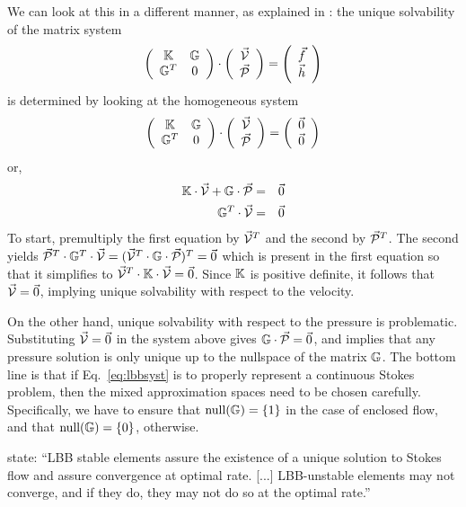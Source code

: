 We can look at this in a different manner, as explained in \textcite{elsw}:
the unique solvability of the matrix system
\begin{equation}
\left(
\begin{array}{cc}
{\mathbb{K}} & {\mathbb{G}} \\
{\mathbb{G}}^T & 0 
\end{array}
\right)
\cdot 
\left(
\begin{array}{c}
\vec{\cal V} \\ \vec{\cal P}
\end{array}
\right)
=
\left(
\begin{array}{c}
\vec{f} \\ \vec{h}
\end{array}
\right)
\label{eq:lbbsyst}
\end{equation}
is determined by looking at the homogeneous system
\begin{equation}
\left(
\begin{array}{cc}
{\mathbb{K}} & {\mathbb{G}} \\
{\mathbb{G}}^T & 0 
\end{array}
\right)
\cdot 
\left(
\begin{array}{c}
\vec{\cal V} \\ \vec{\cal P}
\end{array}
\right)
=
\left(
\begin{array}{c}
\vec{0} \\ \vec{0}
\end{array}
\right)
\end{equation}
or,
\begin{eqnarray}
{\mathbb{K}} \cdot \vec{\cal V} + {\mathbb{G}} \cdot \vec{\cal P} &=& \vec{0} \nonumber\\
{\mathbb{G}}^T \cdot \vec{\cal V} &=& \vec{0}
\end{eqnarray}
To start, premultiply the first equation by $\vec{\cal V}^T$ and the second by 
$\vec{\cal P}^T$. The second yields
$\vec{\cal P}^T \cdot {\mathbb{G}}^T \cdot \vec{\cal V} = ( \vec{\cal V}^T \cdot {\mathbb{G}}\cdot \vec{\cal P}  )^T = \vec{0}$
which is present in the first equation so that it simplifies to $\vec{\cal V}^T\cdot {\mathbb{K}} \cdot \vec{\cal V} = \vec{0}$.
Since ${\mathbb{K}}$ is positive definite, it follows that $\vec{\cal V}=\vec{0}$, implying unique solvability
with respect to the velocity. 

On the other hand, unique solvability with respect to the pressure is problematic. Substituting $\vec{\cal V}=\vec{0}$
in the system above gives ${\mathbb{G}} \cdot \vec{\cal P} = \vec{0}$, and implies that any pressure solution is only unique 
up to the nullspace of the matrix ${\mathbb{G}}$. 
The bottom line is that if Eq.~\eqref{eq:lbbsyst} is to properly represent a continuous Stokes
problem, then the mixed approximation spaces need to be chosen carefully.
Specifically, we have to ensure that $\text{null}({\mathbb{G}})=\{1\}$ in the case of enclosed flow,
and that $\text{null}({\mathbb{G}})=\{0\}$, otherwise.

\textcite{grsa} state: ``LBB stable elements assure the existence of a unique solution to Stokes flow and 
assure convergence at optimal rate. [...] LBB-unstable elements may not converge, and if they do, they may not do so at the optimal rate.''

